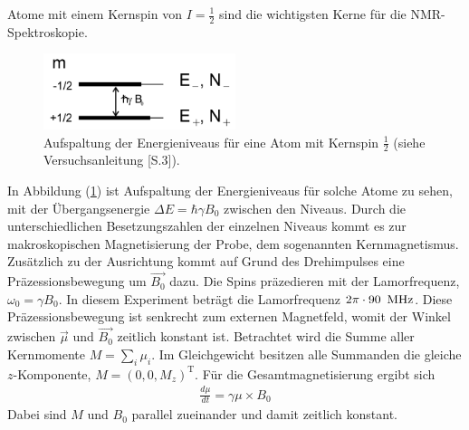 Atome mit einem Kernspin von $I=\frac{1}{2}$ sind die wichtigsten Kerne für die NMR-Spektroskopie.
\begin{figure}[hbtp]
	\centering
	\includegraphics[width=0.5\textwidth]{Plots/energieniveaus.png}
	\caption{Aufspaltung der Energieniveaus f\"{u}r eine Atom mit Kernspin $\frac{1}{2}$ (siehe Versuchsanleitung \cite{Anleitung}[S.3]).}
	\label{Energieniveaus}
\end{figure}
In Abbildung (\ref{Energieniveaus}) ist Aufspaltung der Energieniveaus f\"{u}r solche Atome zu sehen, mit der \"{U}bergangsenergie $\Delta E = \hbar \gamma B_0$ zwischen den Niveaus.
Durch die unterschiedlichen Besetzungszahlen der einzelnen Niveaus kommt es zur makroskopischen Magnetisierung der Probe, dem sogenannten Kernmagnetismus.
Zus\"{a}tzlich zu der Aus{\-}richt{\-}ung kommt auf Grund des Drehimpulses eine Pr\"{a}zessionsbewegung um $\overrightarrow{B_0}$ dazu.
Die Spins pr\"{a}zedieren mit der Lamorfrequenz, $\omega_0 = \gamma B_0$.
In diesem Experiment betr\"{a}gt die Lamorfrequenz $2\pi \cdot 90 \text{\, MHz}$.
Diese Pr\"{a}zessionsbewegung ist senkrecht zum externen Magnetfeld, womit der Winkel zwischen $\overrightarrow{\mu}$ und $\overrightarrow{B_0}$ zeitlich konstant ist.
Betrachtet wird die Summe aller Kernmomente $M = \sum_i \mu_i$.
Im Gleichgewicht besitzen alle Summanden die gleiche $z$-Komponente, $M = (0,0,M_z)^{\text{T}}$.
F\"{u}r die Gesamtmagnetisierung ergibt sich
\begin{align*}
	\frac{d \mu}{d t} = \gamma \mu \times B_0
\end{align*}
Dabei sind $M$ und $B_0$ parallel zueinander und damit zeitlich konstant.


